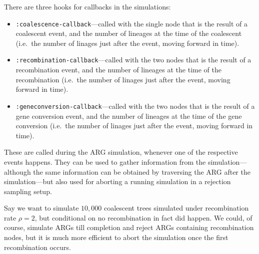 \documentclass{manual}
\begin{document}
\begin{empfile}
There are three hooks for callbacks in the simulations:
\begin{itemize}
\item \texttt{:coalescence-callback}---called with the single node
  that is the result of a coalescent event, and the number of lineages
  at the time of the coalescent (i.e.\ the number of linages just after
  the event, moving forward in time).
\item \texttt{:recombination-callback}---called with the two nodes
  that is the result of a recombination event, and the number of
  lineages at the time of the recombination (i.e.\ the number of
  linages just after the event, moving forward in time).
\item \texttt{:geneconversion-callback}---called with the two nodes
  that is the result of a gene conversion event, and the number of
  lineages at the time of the gene conversion (i.e.\ the number of
  linages just after the event, moving forward in time).
\end{itemize}
These are called during the ARG simulation, whenever one of the
respective events happens.  They can be used to gather information
from the simulation---although the same information can be obtained by
traversing the ARG after the simulation---but also used for aborting a
running simulation in a rejection sampling setup.

Say we want to simulate $10,000$ coalescent trees simulated under
recombination rate $\rho=2$, but conditional on no recombination in
fact did happen.  We could, of course, simulate ARGs till completion
and reject ARGs containing recombination nodes, but it is much more
efficient to abort the simulation once the first recombination occurs.


\end{empfile}
\end{document}
